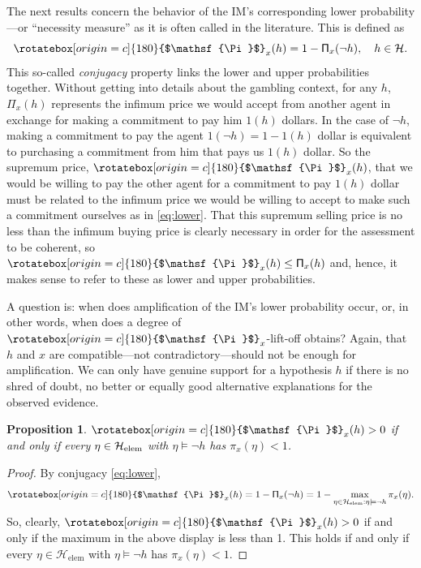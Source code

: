 \documentclass[a4paper, 12pt]{article}
\theoremstyle{plain}
\newtheorem{prop}{Proposition}
\theoremstyle{definition}
\theoremstyle{remark}
\renewcommand{\H}{\mathcal{H}}
\newcommand{\lPi}{\rotatebox[origin=c]{180}{$\mathsf{\Pi}$}} %
\newcommand{\uPi}{\mathsf{\Pi}}%
\begin{document}
The next results concern the behavior of the IM's corresponding lower probability---or ``necessity measure'' as it is often called in the literature.  This is defined as 
\begin{equation}
\label{eq:lower}
\lPi_x(h) = 1 - \uPi_x(\neg h), \quad h \in \H.
\end{equation}
This so-called {\em conjugacy} property links the lower and upper probabilities together.  Without getting into details about the gambling context, for any $h$, $\uPi_x(h)$ represents the infimum price we would accept from another agent in exchange for making a commitment to pay him $1(h)$ dollars.  In the case of $\neg h$, making a commitment to pay the agent $1(\neg h)=1 - 1(h)$ dollar is equivalent to purchasing a commitment from him that pays us $1(h)$ dollar.  So the supremum price, $\lPi_x(h)$, that we would be willing to pay the other agent for a commitment to pay $1(h)$ dollar must be related to the infimum price we would be willing to accept to make such a commitment ourselves as in \eqref{eq:lower}.  That this supremum selling price is no less than the infimum buying price is clearly necessary in order for the assessment to be coherent, so $\lPi_x(h) \leq \uPi_x(h)$ and, hence, it makes sense to refer to these as lower and upper probabilities. 

A question is: when does amplification of the IM's lower probability occur, or, in other words, when does a degree of $\lPi_x$-lift-off obtains?  Again, that $h$ and $x$ are compatible---not contradictory---should not be enough for amplification.  We can only have genuine support for a hypothesis $h$ if there is no shred of doubt, no better or equally good alternative explanations for the observed evidence.

\begin{prop}
\label{prop:lpi.amp}
$\lPi_x(h) > 0$ if and only if every $\eta \in \H_\text{\rm elem}$ with $\eta \models \neg h$ has $\pi_x(\eta) < 1$.
\end{prop}

\begin{proof}
By conjugacy \eqref{eq:lower}, 
\[ \lPi_x(h) = 1 - \uPi_x(\neg h) = 1 - \max_{\eta \in \H_\text{elem}: \eta \models \neg h} \pi_x(\eta). \]
So, clearly, $\lPi_x(h) > 0$ if and only if the maximum in the above display is less than 1.  This holds if and only if every $\eta \in \H_\text{elem}$ with $\eta \models \neg h$ has $\pi_x(\eta) < 1$.
\end{proof}
\end{document}
